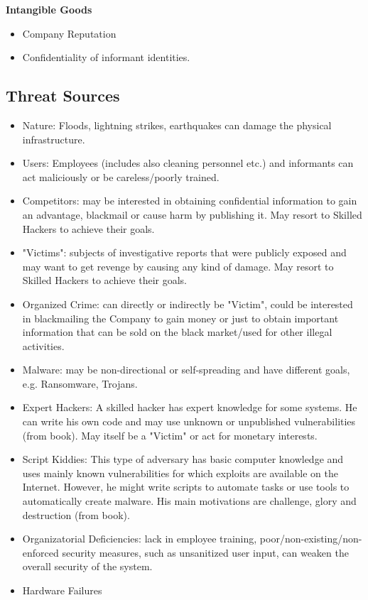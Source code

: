\documentclass[english]{article}
\begin{document}
\noindent\textbf{Intangible Goods}
\begin{itemize}
\item Company Reputation
\item Confidentiality of informant identities.
\end{itemize}

\subsection{Threat Sources}


\begin{itemize}
\item Nature: Floods, lightning strikes, earthquakes can damage the physical infrastructure.
\item Users: Employees (includes also cleaning personnel etc.) and informants can act maliciously or be careless/poorly trained.
\item Competitors: may be interested in obtaining confidential information to gain an advantage, blackmail or cause harm by publishing it. May resort to Skilled Hackers to achieve their goals.
\item "Victims": subjects of investigative reports that were publicly exposed and may want to get revenge by causing any kind of damage. May resort to Skilled Hackers to achieve their goals.
\item Organized Crime: can directly or indirectly be "Victim", could be interested in blackmailing the Company to gain money or just to obtain important information that can be sold on the black market/used for other illegal activities.
\item Malware: may be non-directional or self-spreading and have different goals, e.g. Ransomware, Trojans.
\item Expert Hackers: A skilled hacker has expert knowledge for some systems. He can write his own code and may use unknown or unpublished vulnerabilities (from book). May itself be a "Victim" or act for monetary interests.
\item Script Kiddies: This type of adversary has basic computer knowledge and uses mainly known vulnerabilities for which exploits are available on the Internet. However, he might write scripts to automate tasks or use tools to automatically create malware. His main motivations are challenge, glory and destruction (from book).
\item Organizatorial Deficiencies: lack in employee training, poor/non-existing/non-enforced security measures, such as unsanitized user input, can weaken the overall security of the system.
\item Hardware Failures
\end{itemize}
\end{document}
